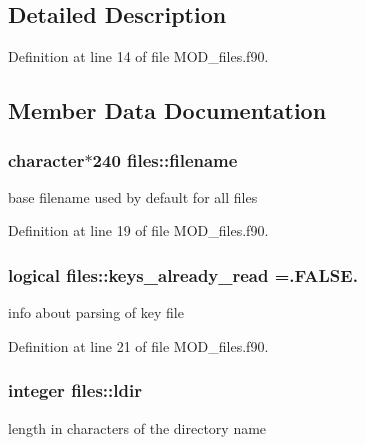 \subsection{Detailed Description}


Definition at line 14 of file M\-O\-D\-\_\-files.\-f90.



\subsection{Member Data Documentation}
\hypertarget{classfiles_a7632b8d9d70c61339b73f9c214b9fca3}{
\subsubsection[{filename}]{\setlength{\rightskip}{0pt plus 5cm}character$\ast$240 files\-::filename}}\label{classfiles_a7632b8d9d70c61339b73f9c214b9fca3}


base filename used by default for all files 



Definition at line 19 of file M\-O\-D\-\_\-files.\-f90.

\hypertarget{classfiles_a70170d340a05a63d29095c72f181334e}{
\subsubsection[{keys\-\_\-already\-\_\-read}]{\setlength{\rightskip}{0pt plus 5cm}logical files\-::keys\-\_\-already\-\_\-read =.F\-A\-L\-S\-E.}}\label{classfiles_a70170d340a05a63d29095c72f181334e}


info about parsing of key file 



Definition at line 21 of file M\-O\-D\-\_\-files.\-f90.

\hypertarget{classfiles_ae4d78338556f80825532a4a5bb1cdc5c}{
\subsubsection[{ldir}]{\setlength{\rightskip}{0pt plus 5cm}integer files\-::ldir}}\label{classfiles_ae4d78338556f80825532a4a5bb1cdc5c}


length in characters of the directory name 



